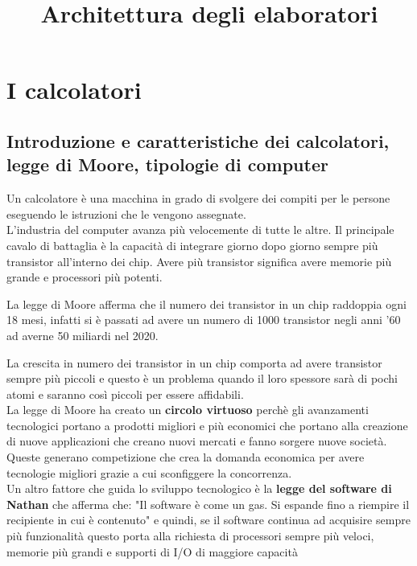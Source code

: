 \documentclass[12pt]{report}
\title{Architettura degli elaboratori}
\date{}
\begin{document}
	{
	\let\cleardoublepage\clearpage
	\maketitle
	\tableofcontents
	}
	\chapter{I calcolatori}
	\section{Introduzione e caratteristiche dei calcolatori, legge di Moore, tipologie di computer}
		Un calcolatore è una macchina in grado di svolgere dei compiti per le persone eseguendo le istruzioni che le vengono assegnate. \\
		L'industria del computer avanza più velocemente di tutte le altre. Il principale cavalo di battaglia è la capacità di integrare giorno dopo giorno sempre più transistor all'interno dei chip. Avere più transistor significa avere memorie più grande e processori più potenti.
		\begin{tcolorbox}[colframe=blue!75!black, colback=white!5!white, title=Legge di Moore, fonttitle=\bfseries]
			La legge di Moore afferma che il numero dei transistor in un chip raddoppia ogni 18 mesi, infatti si è passati ad avere un numero di 1000 transistor negli anni '60 ad averne 50 miliardi nel 2020.
		\end{tcolorbox}
		La crescita in numero dei transistor in un chip comporta ad avere transistor sempre più piccoli e questo è un problema quando il loro spessore sarà di pochi atomi e saranno così piccoli per essere affidabili. \\
		La legge di Moore ha creato un \textbf{circolo virtuoso} perchè gli avanzamenti tecnologici portano a prodotti migliori e più economici che portano alla creazione di nuove applicazioni che creano nuovi mercati e fanno sorgere nuove società. Queste generano competizione che crea la domanda economica per avere tecnologie migliori grazie a cui sconfiggere la concorrenza. \\
		Un altro fattore che guida lo sviluppo tecnologico è la \textbf{legge del software di Nathan} che afferma che: "Il software è come un gas. Si espande fino a riempire il recipiente in cui è contenuto" e quindi, se il software continua ad acquisire sempre più funzionalità questo porta alla richiesta di processori sempre più veloci, memorie più grandi e supporti di I/O di maggiore capacità
		\\
\end{document}
